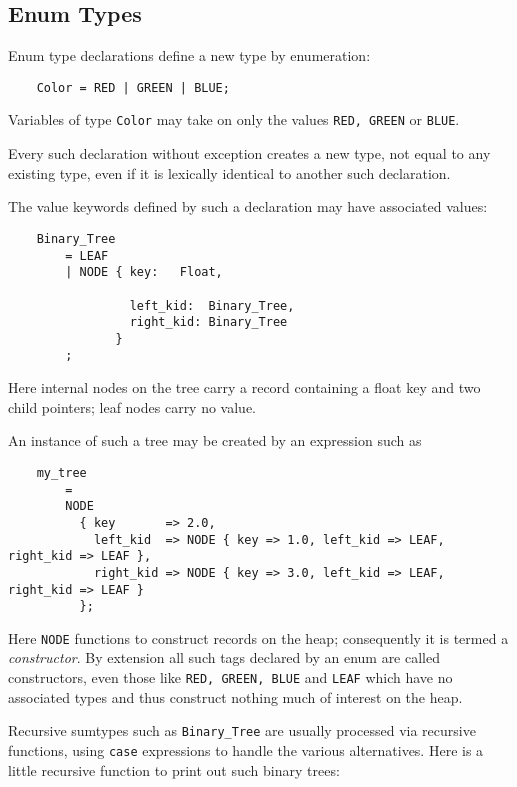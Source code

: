 \cutend*



\subsection{Enum Types}
\label{section:ref:types:enum-types}

Enum type declarations define a new type by enumeration:

\begin{verbatim}
    Color = RED | GREEN | BLUE;
\end{verbatim}

Variables of type {\tt Color} may take on only the values 
{\tt RED, GREEN} or {\tt BLUE}.

Every such declaration without exception creates a new 
type, not equal to any existing type, even if it is 
lexically identical to another such declaration.

The value keywords defined by such a declaration may have 
associated values:

\begin{verbatim}
    Binary_Tree
        = LEAF
        | NODE { key:   Float,

                 left_kid:  Binary_Tree,
                 right_kid: Binary_Tree
               }
        ;
\end{verbatim}

Here internal nodes on the tree carry a record  
containing a float key and two child pointers;  leaf nodes carry no value.

An instance of such a tree may be created by an expression such as

\begin{verbatim}
    my_tree
        =
        NODE
          { key       => 2.0,
            left_kid  => NODE { key => 1.0, left_kid => LEAF, right_kid => LEAF },
            right_kid => NODE { key => 3.0, left_kid => LEAF, right_kid => LEAF }
          };
\end{verbatim}

Here {\tt NODE} functions to construct records on the heap; 
consequently it is termed a {\it constructor}.  By extension 
all such tags declared by an enum are called constructors, 
even those like {\tt RED, GREEN, BLUE} and {\tt LEAF} which 
have no associated types and thus construct nothing much of 
interest on the heap.

Recursive sumtypes such as {\tt Binary\_Tree} are usually 
processed via recursive functions, using {\tt case} expressions 
to handle the various alternatives.  Here is a little 
recursive function to print out such binary trees: 

